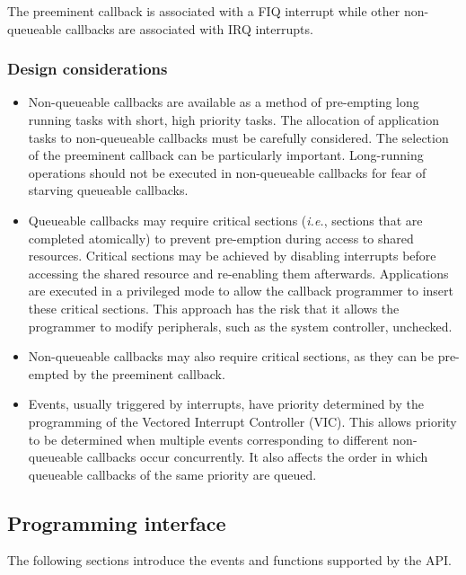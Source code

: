 \documentclass[11pt,a4paper,twoside]{article}
\begin{document}
The preeminent callback is associated with a FIQ interrupt while other
non-queueable callbacks are associated with IRQ interrupts.

\subsubsection{Design considerations}

\begin{itemize}

\item
Non-queueable callbacks are available as a method of pre-empting long
running tasks with short, high priority tasks. The allocation of
application tasks to non-queueable callbacks must be carefully
considered. The selection of the preeminent callback can be
particularly important. Long-running operations should not be executed
in non-queueable callbacks for fear of starving queueable callbacks.

\item
Queueable callbacks may require critical sections (\emph{i.e.},
sections that are completed atomically) to prevent pre-emption during
access to shared resources. Critical sections may be achieved by
disabling interrupts before accessing the shared resource and
re-enabling them afterwards. Applications are executed in a privileged
mode to allow the callback programmer to insert these critical
sections. This approach has the risk that it allows the programmer to
modify peripherals, such as the system controller, unchecked.

\item
Non-queueable callbacks may also require critical sections, as they
can be pre-empted by the preeminent callback.

\item
Events, usually triggered by interrupts, have priority determined by
the programming of the Vectored Interrupt Controller (VIC). This
allows priority to be determined when multiple events corresponding to
different non-queueable callbacks occur concurrently. It also affects
the order in which queueable callbacks of the same priority are
queued.

\end{itemize}

\subsection{Programming interface}
\label{sec:API}

The following sections introduce the events and functions supported by
the API.
\end{document}
